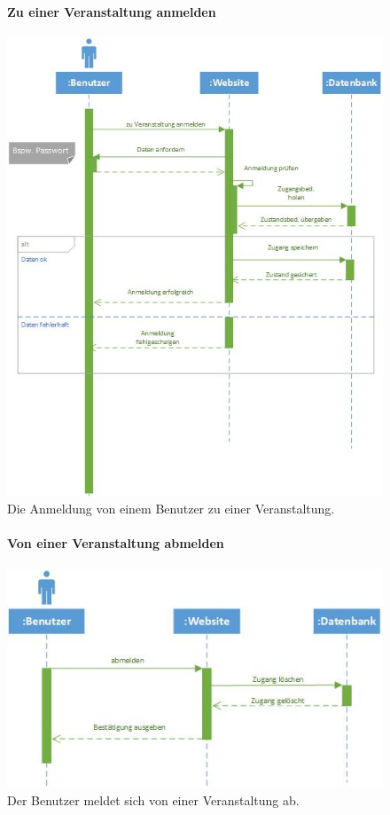 \documentclass[12pt,a4paper]{article}
\begin{document}
\begin{figure}[H]
	\centering
	\paragraph{Zu einer Veranstaltung anmelden}
	\includegraphics[width=\textwidth]{Bilder/Sequenzdiagramme/ZuVeranstaltungAnmelden1.jpg}
	\caption{Die Anmeldung von einem Benutzer zu einer Veranstaltung.}
	\label{SzZuVeranstaltungAnmelden}
\end{figure}
\begin{figure}[H]
	\centering
	\paragraph{Von einer Veranstaltung abmelden}
	\includegraphics[width=\textwidth]{Bilder/Sequenzdiagramme/VonVeranstaltungAbmelden1.jpg}
	\caption{Der Benutzer meldet sich von einer Veranstaltung ab.}
	\label{SzVonVeranstaltungAbmelden}
\end{figure}
\end{document}

